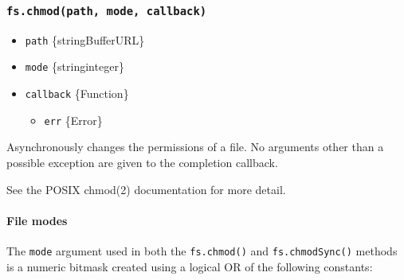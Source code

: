 \subsubsection{\texorpdfstring{\texttt{fs.chmod(path,\ mode,\ callback)}}{fs.chmod(path, mode, callback)}}\label{fs.chmodpath-mode-callback}

\begin{itemize}
\tightlist
\item
  \texttt{path} \{string\textbar Buffer\textbar URL\}
\item
  \texttt{mode} \{string\textbar integer\}
\item
  \texttt{callback} \{Function\}

  \begin{itemize}
  \tightlist
  \item
    \texttt{err} \{Error\}
  \end{itemize}
\end{itemize}

Asynchronously changes the permissions of a file. No arguments other
than a possible exception are given to the completion callback.

See the POSIX chmod(2) documentation for more detail.

\begin{Shaded}
\begin{Highlighting}[]
 \OperatorTok{;}

\NormalTok{(}\OperatorTok{,} \OperatorTok{,}\KeywordTok{=\textgreater{}}\NormalTok{ \{}
  \OperatorTok{;}
  \NormalTok{(}\NormalTok{)}\OperatorTok{;}
\NormalTok{\})}\OperatorTok{;}
\end{Highlighting}
\end{Shaded}

\paragraph{File modes}\label{file-modes}

The \texttt{mode} argument used in both the \texttt{fs.chmod()} and
\texttt{fs.chmodSync()} methods is a numeric bitmask created using a
logical OR of the following constants:

